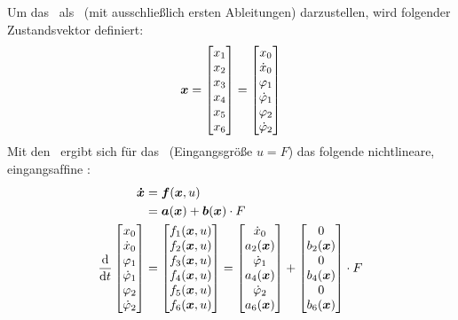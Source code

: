 Um das \spds\ als \zrm\ (mit ausschließlich ersten Ableitungen) darzustellen, wird folgender Zustandsvektor definiert:
\begin{align}
	\boldsymbol{x} = \begin{bmatrix}
		x_1 \\	x_2 \\	x_3 \\	x_4 \\	x_5 \\	x_6 \\	
	\end{bmatrix} = \begin{bmatrix}
		x_0 \\ \dot{x}_0 \\ \varphi_1 \\ \dot{\varphi}_1 \\ \varphi_2 \\ \dot{\varphi}_2
	\end{bmatrix}
	\label{eq:vex}
\end{align}
Mit den \bwgl\ ergibt sich für das \krs\ (Eingangsgröße $u=F$) das folgende nichtlineare, eingangsafﬁne \zrm:
\begin{align}
	\vexp &= \ve{f}(\vex,u)  \\
		&= \ve{a}(\vex) + \ve{b}(\vex) \cdot F  
		\label{eq:zrm} 
		\\\vspace{100cm}
	\ddt \begin{bmatrix}
		\xo \\ \xop \\ \phe \\ \phep \\ \phz \\ \phzp
	\end{bmatrix} &= \begin{bmatrix}
		f_1(\vex,u) \\ f_2(\vex,u) \\  f_3(\vex,u) \\  f_4(\vex,u) \\  f_5(\vex,u) \\  f_6(\vex,u)
	\end{bmatrix}= \begin{bmatrix}
		\xop \\ a_2(\vex) \\ \phep \\  a_4(\vex) \\ \phzp \\  a_6(\vex)
	\end{bmatrix} + \begin{bmatrix}
		0 \\ b_2(\vex) \\ 0 \\  b_4(\vex) \\ 0 \\  b_6(\vex)
	\end{bmatrix} \cdot F
	\label{eq:zrmF}
\end{align}

